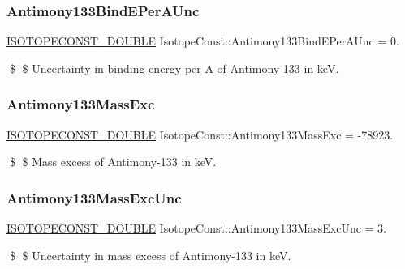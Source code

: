 \subsubsection{\texorpdfstring{Antimony133\+Bind\+E\+Per\+A\+Unc}{Antimony133BindEPerAUnc}}
{\footnotesize\ttfamily \mbox{\hyperlink{group___isotope_const-_macros_ga8f45a7272ce02c0b4c65c44636ed719a}{I\+S\+O\+T\+O\+P\+E\+C\+O\+N\+S\+T\+\_\+\+D\+O\+U\+B\+LE}} Isotope\+Const\+::\+Antimony133\+Bind\+E\+Per\+A\+Unc = 0.}

\$ \$ Uncertainty in binding energy per A of Antimony-\/133 in keV. \mbox{\label{group___isotope_const-_antimony-_sb133_ga14c6daf01d76e4b0c6af80e68d995c3e}} 
\subsubsection{\texorpdfstring{Antimony133\+Mass\+Exc}{Antimony133MassExc}}
{\footnotesize\ttfamily \mbox{\hyperlink{group___isotope_const-_macros_ga8f45a7272ce02c0b4c65c44636ed719a}{I\+S\+O\+T\+O\+P\+E\+C\+O\+N\+S\+T\+\_\+\+D\+O\+U\+B\+LE}} Isotope\+Const\+::\+Antimony133\+Mass\+Exc = -\/78923.}

\$ \$ Mass excess of Antimony-\/133 in keV. \mbox{\label{group___isotope_const-_antimony-_sb133_ga4c2a8e964d60f28bac35d4775149f337}} 
\subsubsection{\texorpdfstring{Antimony133\+Mass\+Exc\+Unc}{Antimony133MassExcUnc}}
{\footnotesize\ttfamily \mbox{\hyperlink{group___isotope_const-_macros_ga8f45a7272ce02c0b4c65c44636ed719a}{I\+S\+O\+T\+O\+P\+E\+C\+O\+N\+S\+T\+\_\+\+D\+O\+U\+B\+LE}} Isotope\+Const\+::\+Antimony133\+Mass\+Exc\+Unc = 3.}

\$ \$ Uncertainty in mass excess of Antimony-\/133 in keV. \mbox{\label{group___isotope_const-_antimony-_sb133_gad5859a407364611b8e2424fe0ed0cf7c}} 
